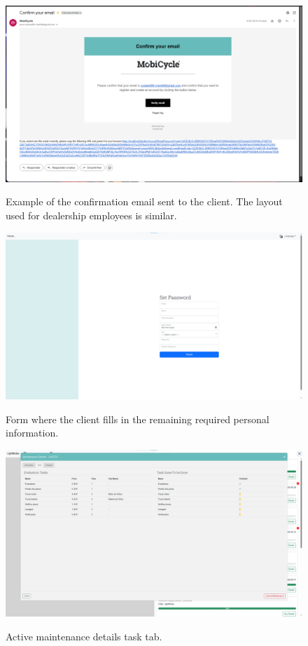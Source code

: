 \begin{figure}[htbp]
  \caption{Example of the confirmation email sent to the client. The layout used for dealership employees is similar.}
  \centering
  \includegraphics[width=\textwidth]{figs/Implementation/rececionist/CreateClient}
  \label{fig:CreateClient}
\end{figure}



\begin{figure}[htbp]
  \caption{Form where the client fills in the remaining required personal information.}
  \centering
  \includegraphics[width=\textwidth]{figs/Implementation/rececionist/SetPassword}
  \label{fig:SetPassword}
\end{figure}

\begin{figure}[htbp]
  \caption{Active maintenance details task tab.}
  \centering
  \includegraphics[width=\textwidth]{figs/Implementation/rececionist/maintenance_details_task}
  \label{fig:impReceMaintTask}
\end{figure}


